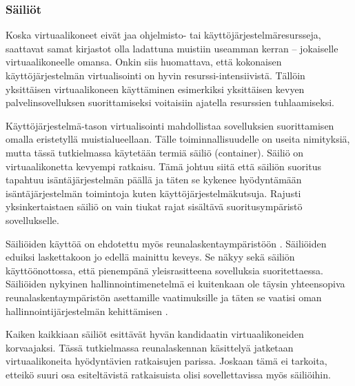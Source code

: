 \subsubsection*{Säiliöt}
Koska virtuaalikoneet eivät jaa ohjelmisto- tai käyttöjärjestelmäresursseja, saattavat samat kirjastot olla ladattuna muistiin useamman kerran – jokaiselle virtuaalikoneelle omansa.
Onkin siis huomattava, että kokonaisen käyttöjärjestelmän virtualisointi on hyvin resurssi-intensiivistä. Tällöin yksittäisen virtuaalikoneen käyttäminen esimerkiksi yksittäisen kevyen palvelinsovelluksen suorittamiseksi voitaisiin ajatella resurssien tuhlaamiseksi. 

Käyttöjärjestelmä-tason virtualisointi mahdollistaa sovelluksien suorittamisen omalla eristetyllä muistialueellaan. 
Tälle toiminnallisuudelle on useita nimityksiä, mutta tässä tutkielmassa käytetään termiä säiliö (container).
Säiliö on virtuaalikonetta kevyempi ratkaisu. 
Tämä johtuu siitä että säiliön suoritus tapahtuu isäntäjärjestelmän päällä ja täten se kykenee hyödyntämään isäntäjärjestelmän toimintoja kuten käyttöjärjestelmäkutsuja.
Rajusti yksinkertaistaen säiliö on vain tiukat rajat sisältävä suoritusympäristö sovellukselle.

Säiliöiden käyttöä on ehdotettu myös reunalaskentaympäristöön \cite{pahl2015containers}. Säiliöiden eduiksi laskettakoon jo edellä mainittu keveys. Se näkyy sekä säiliön käyttöönottossa, että pienempänä yleisrasitteena sovelluksia suoritettaessa.
Säiliöiden nykyinen hallinnointimenetelmä ei kuitenkaan ole täysin yhteensopiva reunalaskentaympäristön asettamille vaatimuksille ja täten se vaatisi oman hallinnointijärjestelmän kehittämisen \cite{farris2017providing}.

Kaiken kaikkiaan säiliöt esittävät hyvän kandidaatin virtuaalikoneiden korvaajaksi. 
Tässä tutkielmassa reunalaskennan käsittelyä jatketaan virtuaalikoneita hyödyntävien ratkaisujen parissa.
Joskaan tämä ei tarkoita, etteikö suuri osa esiteltävistä ratkaisuista olisi sovellettavissa myös säiliöihin. 
